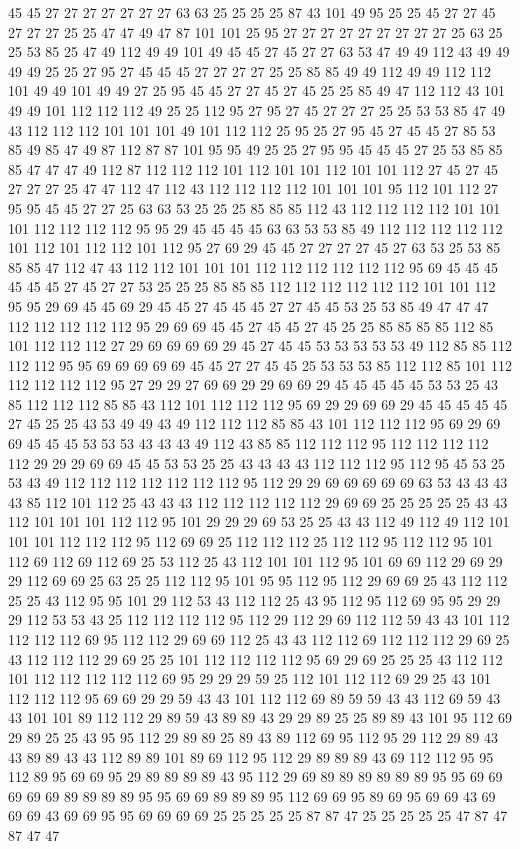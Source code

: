 45 45 27 27 27 27 27 27 27 63 63 25 25 25 25 87 43 101 49 95 25 25 45 27 27 45 27 27 27 25 25 47 47 49 47 87 101 101 25 95 27 27 27 27 27 27 27 27 27 25 63 25 25 53 85 25 47 49 112 49 49 101 49 45 45 27 45 27 27 63 53 47 49 49 112 43 49 49 49 49 25 25 27 95 27 45 45 45 27 27 27 27 25 25 85 85 49 49 112 49 49 112 112 101 49 49 101 49 49 27 25 95 45 45 27 27 45 27 45 25 25 85 49 47 112 112 43 101 49 49 101 112 112 112 49 25 25 112 95 27 95 27 45 27 27 27 25 25 53 53 85 47 49 43 112 112 112 101 101 101 49 101 112 112 25 95 25 27 95 45 27 45 45 27 85 53 85 49 85 47 49 87 112 87 87 101 95 95 49 25 25 27 95 95 45 45 45 27 25 53 85 85 85 47 47 47 49 112 87 112 112 112 101 112 101 101 112 101 101 112 27 45 27 45 27 27 27 25 47 47 112 47 112 43 112 112 112 112 101 101 101 95 112 101 112 27 95 95 45 45 27 27 25 63 63 53 25 25 25 85 85 85 112 43 112 112 112 112 101 101 101 112 112 112 112 95 95 29 45 45 45 45 63 63 53 53 85 49 112 112 112 112 112 101 112 101 112 112 101 112 95 27 69 29 45 45 27 27 27 27 45 27 63 53 25 53 85 85 85 47 112 47 43 112 112 101 101 101 112 112 112 112 112 112 95 69 45 45 45 45 45 45 27 45 27 27 53 25 25 25 85 85 85 112 112 112 112 112 112 101 101 112 95 95 29 69 45 45 69 29 45 45 27 45 45 45 27 27 45 45 53 25 53 85 49 47 47 47 112 112 112 112 112 95 29 69 69 45 45 27 45 45 27 45 25 25 85 85 85 85 112 85 101 112 112 112 27 29 69 69 69 69 29 45 27 45 45 53 53 53 53 53 49 112 85 85 112 112 112 95 95 69 69 69 69 69 45 45 27 27 45 45 25 53 53 53 85 112 112 85 101 112 112 112 112 112 95 27 29 29 27 69 69 29 29 69 69 29 45 45 45 45 45 53 53 25 43 85 112 112 112 85 85 43 112 101 112 112 112 95 69 29 29 69 69 29 45 45 45 45 45 27 45 25 25 43 53 49 49 43 49 112 112 112 85 85 43 101 112 112 112 95 69 29 69 69 45 45 45 53 53 53 43 43 43 49 112 43 85 85 112 112 112 95 112 112 112 112 112 29 29 29 69 69 45 45 53 53 25 25 43 43 43 43 112 112 112 95 112 95 45 53 25 53 43 49 112 112 112 112 112 112 112 95 112 29 29 69 69 69 69 69 63 53 43 43 43 43 85 112 101 112 25 43 43 43 112 112 112 112 112 29 69 69 25 25 25 25 25 43 43 112 101 101 101 112 112 95 101 29 29 29 69 53 25 25 43 43 112 49 112 49 112 101 101 101 112 112 112 95 112 69 69 25 112 112 112 25 112 112 95 112 112 95 101 112 69 112 69 112 69 25 53 112 25 43 112 101 101 112 95 101 69 69 112 29 69 29 29 112 69 69 25 63 25 25 112 112 95 101 95 95 112 95 112 29 69 69 25 43 112 112 25 25 43 112 95 95 101 29 112 53 43 112 112 25 43 95 112 95 112 69 95 95 29 29 29 112 53 53 43 25 112 112 112 112 95 112 29 112 29 69 112 112 59 43 43 101 112 112 112 112 69 95 112 112 29 69 69 112 25 43 43 112 112 69 112 112 112 29 69 25 43 112 112 112 29 69 25 25 101 112 112 112 112 95 69 29 69 25 25 25 43 112 112 101 112 112 112 112 112 69 95 29 29 29 59 25 112 101 112 112 69 29 25 43 101 112 112 112 95 69 69 29 29 59 43 43 101 112 112 69 89 59 59 43 43 112 69 59 43 43 101 101 89 112 112 29 89 59 43 89 89 43 29 29 89 25 25 89 89 43 101 95 112 69 29 89 25 25 43 95 95 112 29 89 89 25 89 43 89 112 69 95 112 95 29 112 29 89 43 43 89 89 43 43 112 89 89 101 89 69 112 95 112 29 89 89 89 43 69 112 112 95 95 112 89 95 69 69 95 29 89 89 89 89 43 95 112 29 69 89 89 89 89 89 89 95 95 69 69 69 69 69 89 89 89 89 95 95 69 69 89 89 89 95 112 69 69 95 89 69 95 69 69 43 69 69 69 43 69 69 95 95 69 69 69 69 25 25 25 25 25 87 87 47 25 25 25 25 25 47 87 47 87 47 47 